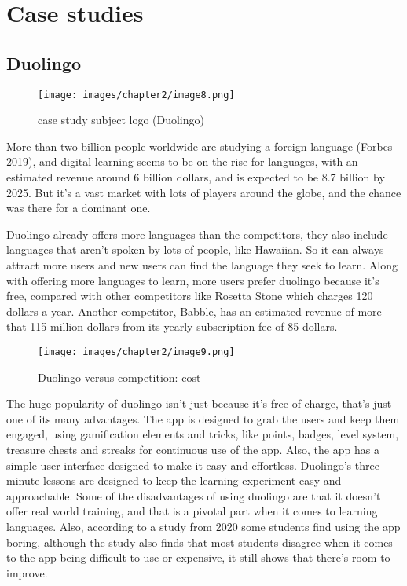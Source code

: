 \documentclass[../main.tex]{subfiles}
\begin{document}
\section{Case studies}
\subsection{Duolingo}

\begin{figure}[!ht]
\centering
\texttt{[image: images/chapter2/image8.png]}
\caption{case study subject logo (Duolingo)}
\label{case study subject logo (Duolingo)}
\end{figure}

More than two billion people worldwide are studying a foreign language (Forbes 2019), and digital learning seems to be on the rise for languages, with an estimated revenue around 6 billion dollars, and is expected to be 8.7 billion by 2025. But it's a vast market with lots of players around the globe, and the chance was there for a dominant one.

Duolingo already offers more languages than the competitors, they also include languages that aren’t spoken by lots of people, like Hawaiian. So it can always attract more users and new users can find the language they seek to learn. Along with offering more languages to learn, more users prefer duolingo because it’s free, compared with other competitors like Rosetta Stone which charges 120 dollars a year. Another competitor, Babble, has an estimated revenue of more that 115 million dollars from its yearly subscription fee of 85 dollars. 

\begin{figure}[!ht]
\centering
\texttt{[image: images/chapter2/image9.png]}
\caption{Duolingo versus competition: cost }
\label{Duolingo versus competition: cost }
\end{figure}

The huge popularity of duolingo isn’t just because it’s free of charge, that’s just one of its many advantages. The app is designed to grab the users and keep them engaged, using gamification elements and tricks, like points, badges, level system, treasure chests and streaks for continuous use of the app. Also, the app has a simple user interface designed to make it easy and effortless.
\newpage 
Duolingo’s three-minute lessons are designed to keep the learning experiment easy and approachable. Some of the disadvantages of using duolingo are that it doesn’t offer real world training, and that is a pivotal part when it comes to learning languages. Also, according to a study from 2020 some students find using the app boring, although the study also finds that most students disagree when it comes to the app being difficult to use or expensive, it still shows that there’s room to improve. \cite{28}\cite{29}
\end{document}

